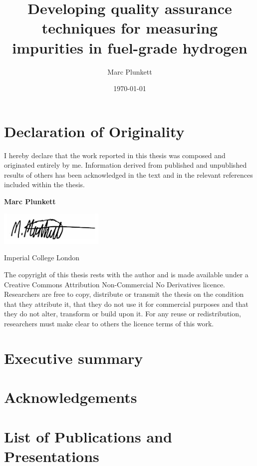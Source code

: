 \documentclass{report}
\begin{document}
\title{Developing  quality assurance techniques for measuring impurities in fuel-grade hydrogen}
\author{Marc Plunkett}
\date{\today}
\maketitle

\chapter*{Declaration of Originality}
I hereby declare that the work reported in this thesis was composed and originated entirely by me. Information derived from published and unpublished results of others has been acknowledged in the text and in the relevant references included within the thesis.

\noindent\newline
\textbf{Marc Plunkett}\newline

\includegraphics[width=50mm,scale=0.5]{figures/sig.png}\newline

\noindent
Imperial College London\newline

The copyright of this thesis rests with the author and is made available under a Creative Commons Attribution Non-Commercial No Derivatives licence. Researchers are free to copy, distribute or transmit the thesis on the condition that they attribute it, that they do not use it for commercial purposes and that they do not alter, transform or build upon it. For any reuse or redistribution, researchers must make clear to others the licence terms of this work.


\chapter*{Executive summary}

\chapter*{Acknowledgements}

\chapter*{List of Publications and Presentations}
\end{document}
